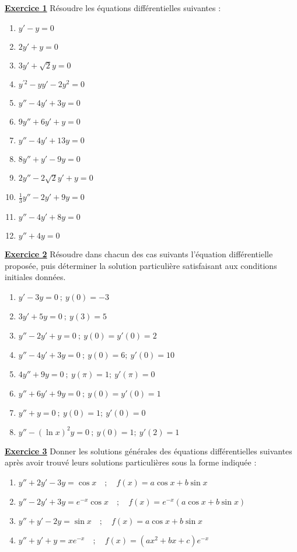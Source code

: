 \documentclass[12pt,a4paper]{article}
\newcommand{\exo}[1]{%
        \textbf{\underline{Exercice #1}}
}
\begin{document}
\begin{multicols}{2}
\setlength{\columnseprule}{0.1mm}

\exo{1} Résoudre les équations différentielles suivantes :
\begin{multicols}{2}
\begin{enumerate}[align=left]
    \item \( y' - y = 0 \)
    \item \( 2y' + y = 0 \)
    \item \( 3y' + \sqrt{2}y = 0 \)
    \item \( y^{\prime 2} - yy' - 2y^2 = 0 \)
    \item \( y'' - 4y' + 3y = 0 \)
    \item \( 9y'' + 6y' + y = 0 \)
    \item \( y'' - 4y' + 13y = 0 \)
    \item \( 8y'' + y' - 9y = 0 \)
    \item \( 2y'' - 2\sqrt{2}y' + y = 0 \)
    \item \( \tfrac{1}{3}y'' - 2y' + 9y = 0 \)
    \item \( y'' - 4y' + 8y = 0 \)
    \item \( y'' + 4y = 0 \)
\end{enumerate}
\end{multicols}

\exo{2} Résoudre dans chacun des cas suivants l’équation différentielle proposée, puis déterminer la solution particulière satisfaisant aux conditions initiales données.
\begin{enumerate}
    \item \( y' - 3y = 0 \ ;\ y(0) = -3 \)
    \item \( 3y' + 5y = 0 \ ;\ y(3) = 5 \)
    \item \( y'' - 2y' + y = 0 \ ;\ y(0) = y'(0) = 2 \)
    \item \( y'' - 4y' + 3y = 0 \ ;\ y(0) = 6 ;\ y'(0) = 10 \)
    \item \( 4y'' + 9y = 0 \ ;\ y(\pi) = 1 ;\ y'(\pi) = 0 \)
    \item \( y'' + 6y' + 9y = 0 \ ;\ y(0) = y'(0) = 1 \)
    \item \( y'' + y = 0 \ ;\ y(0) = 1 ;\ y'(0) = 0 \)
    \item \( y'' - (\ln x)^2 y = 0 \ ;\ y(0) = 1 ;\ y'(2) = 1 \)
\end{enumerate}

\exo{3} Donner les solutions générales des équations différentielles suivantes après avoir trouvé leurs solutions particulières sous la forme indiquée :
\begin{enumerate}
    \item \( y'' + 2y' - 3y = \cos x \quad ;\quad f(x) = a \cos x + b \sin x \)
    \item \( y'' - 2y' + 3y = e^{-x} \cos x \quad ;\quad f(x) = e^{-x}(a \cos x + b \sin x) \)
    \item \( y'' + y' - 2y = \sin x \quad ;\quad f(x) = a \cos x + b \sin x \)
    \item \( y'' + y' + y = xe^{-x} \quad ;\quad f(x) = (ax^2 + bx + c)e^{-x} \)
\end{enumerate}


\end{multicols}
\end{document}
